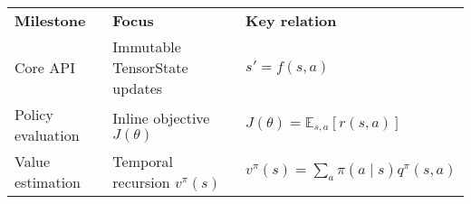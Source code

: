 \begin{tabular}{lll}
\textbf{Milestone} & \textbf{Focus} & \textbf{Key relation} \\
Core API & Immutable TensorState updates & $s' = f(s, a)$ \\
Policy evaluation & Inline objective $J(\theta)$ & $J(\theta) = \mathbb{E}_{s, a}[r(s, a)]$ \\
Value estimation & Temporal recursion $v^{\pi}(s)$ & $v^{\pi}(s) = \sum_a \pi(a \mid s) q^{\pi}(s, a)$ \\
\end{tabular}
